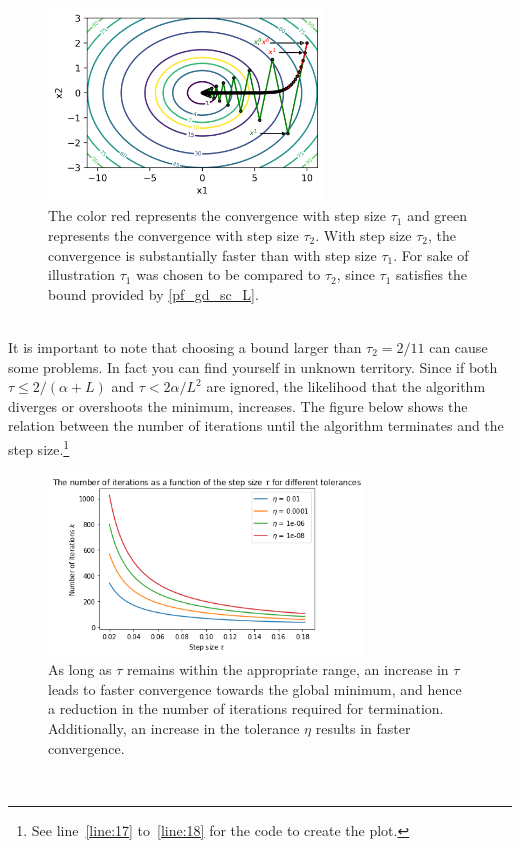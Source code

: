 \begin{figure}[h!]
    \centering
        \includegraphics[width=0.65\textwidth]{Pictures/Level sets of ellipsoid_fixed.png}
    \caption{The color red represents the convergence with step size $\tau_{1}$ and green represents the convergence with step size $\tau_{2}.$ With step size $\tau_{2}$, the convergence is substantially faster than with step size $\tau_{1}.$ For sake of illustration $\tau_{1}$ was chosen to be compared to $\tau_{2}$, since $\tau_{1}$ satisfies the bound provided by \ref{pf_gd_sc_L}.}\label{fig:levelsets1_fixed}
\end{figure}\\
It is important to note that choosing a bound larger than $\tau_{2} = 2/11$ can cause some problems. In fact you can find yourself in unknown territory. Since if both $\tau \leq 2/(\alpha + L) $ and $\tau < 2\alpha / L^{2}$ are ignored, the likelihood that the algorithm diverges or overshoots the minimum, increases. The figure below shows the relation between the number of iterations until the algorithm terminates and the step size.\footnote{See line~\ref{line:17} to~\ref{line:18} for the code to create the plot.} 
\begin{figure}[h!]
    \centering
        \includegraphics[width=0.75\textwidth]{Pictures/GD ellipsoid_fixed_iterations_vs_stepsize.png}
    \caption{As long as $\tau$ remains within the appropriate range, an increase in $\tau$ leads to faster convergence towards the global minimum, and hence a reduction in the number of iterations required for termination. Additionally, an increase in the tolerance $\eta$ results in faster convergence.}\label{fig:GD_ell_fixed_iter}
\end{figure}\\
\newpage
